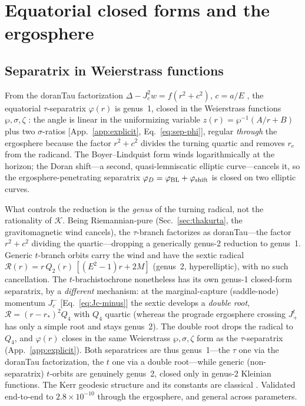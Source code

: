 \documentclass[
    aps, prd, twocolumn, superscriptaddress,
    showpacs, nofootinbib, floatfix
]{revtex4-2}
\newcommand{\re}{r_{e}}
\newcommand{\Jc}{J_{c}}
\begin{document}
\section{Equatorial closed forms and the ergosphere}
\label{sec:closed}

\subsection{Separatrix in Weierstrass functions}
\label{sec:separatrix}
From the doranTau factorization $\Delta-\Jc^2 w=f(r^2+c^2)$, $c=a/E$
\cite{RosignoliKerr}, the
equatorial $\tau$-separatrix $\varphi(r)$ is genus~1, closed in the
Weierstrass functions $\wp,\sigma,\zeta$
\cite{WhittakerWatson,DLMF,Hackmann2008,Hackmann2010}: the angle is linear in the
uniformizing variable $z(r)=\wp^{-1}(A/r+B)$ plus two $\sigma$-ratios
[App.~\ref{app:explicit}, Eq.~\eqref{eq:sep-phi}], regular \emph{through} the
ergosphere because the factor $r^2+c^2$ divides the turning quartic and removes
$\re$ from the radicand. The Boyer--Lindquist form winds logarithmically at the
horizon; the Doran shift---a second, quasi-lemniscatic elliptic
curve---cancels it, so the ergosphere-penetrating separatrix
$\varphi_D=\varphi_{\rm BL}+\varphi_{\rm shift}$ is closed on two elliptic curves.

What controls the reduction is the \emph{genus} of the turning radical, not the
rationality of $\mathcal K$. Being Riemannian-pure
(Sec.~\ref{sec:thakurta}, the gravitomagnetic wind cancels), the $\tau$-branch
factorizes as doranTau---the factor $r^2+c^2$ dividing the quartic---dropping a
generically genus-2 reduction to genus~1. Generic $t$-branch orbits carry the
wind and have the sextic radical
$\mathcal R(r)=r\,Q_2(r)\,[(E^2-1)r+2M]$ (genus~2, hyperelliptic), with no such
cancellation. The $t$-brachistochrone nonetheless has its own genus-1 closed-form
separatrix, by a \emph{different} mechanism: at the marginal-capture (saddle-node)
momentum $J_c^-$ [Eq.~\eqref{eq:Jc-minus}] the sextic develops a \emph{double
root}, $\mathcal R=(r-r_*)^2 Q_4$ with $Q_4$ quartic (whereas the prograde
ergosphere crossing $J_+^t$ has only a simple root and stays genus~2). The double
root drops the radical to $Q_4$, and $\varphi(r)$ closes in the same
Weierstrass $\wp,\sigma,\zeta$ form as the $\tau$-separatrix
(App.~\ref{app:explicit}). Both separatrices are thus genus~1---the $\tau$ one
via the doranTau factorization, the $t$ one via a double root---while generic
(non-separatrix) $t$-orbits are genuinely genus~2, closed only in genus-2
Kleinian functions.
The Kerr geodesic structure and its constants are classical
\cite{Carter1968,Chandrasekhar}. Validated end-to-end to
$2.8\times10^{-10}$ through the ergosphere, and general across parameters.
\end{document}
